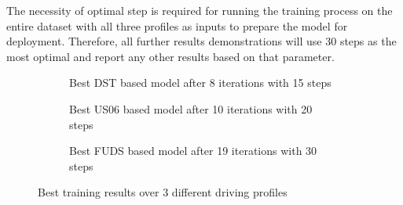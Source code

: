     The necessity of optimal step is required for running the training process on the entire dataset with all three profiles as inputs to prepare the model for deployment.
    Therefore, all further results demonstrations will use 30 steps as the most optimal and report any other results based on that parameter.
    \begin{figure}[htbp]
        \centering
        \begin{subfigure}[b]{0.325\textwidth}
            \centering
            
            \caption{Best DST based model after 8 iterations with 15 steps}
            \label{subfig:res_DST}
        \end{subfigure}
        \hfill
        \begin{subfigure}[b]{0.325\textwidth}
            \centering
            
            \caption{Best US06 based model after 10 iterations with 20 steps}
            \label{subfig:res_US}
        \end{subfigure}
        \hfill
        \begin{subfigure}[b]{0.325\textwidth}
            \centering
            
            \caption{Best FUDS based model after 19 iterations with 30 steps}
            \label{subfig:res_FUDS}
        \end{subfigure}
        \caption{Best training results over 3 different driving profiles}
        \label{fig:Models_res}
    \end{figure}